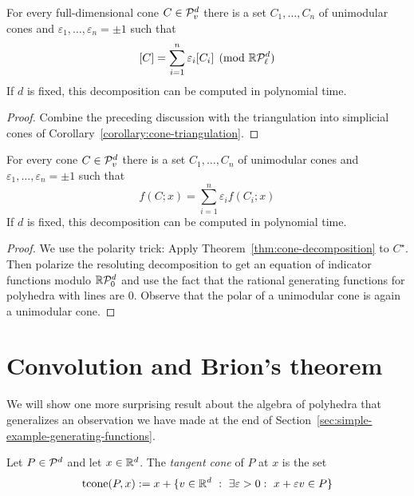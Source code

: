 \begin{theorem}
  \label{thm:cone-decomposition}
  For every full-dimensional cone $C \in \mathcal{P}_v^d$
  there is a set $C_1, \ldots, C_n$ of unimodular cones
  and $\varepsilon_1, \ldots, \varepsilon_n = \pm 1$ such that
  \[
    [C] = \sum_{i=1}^n \varepsilon_i [C_i] \pmod{\mathbb{R}\mathcal{P}_\ell^d}
  \]
  If $d$ is fixed, this decomposition can be computed in polynomial time.
\end{theorem}
\begin{proof}
  Combine the preceding discussion with the triangulation into simplicial cones of Corollary~\ref{corollary:cone-triangulation}.
\end{proof}

\begin{corollary}
  \label{corollary:cone-decomposition}
  For every cone $C \in \mathcal{P}_v^d$
  there is a set $C_1, \ldots, C_n$ of unimodular cones
  and $\varepsilon_1, \ldots, \varepsilon_n = \pm1$ such that
  \[
    f(C;x) = \sum_{i=1}^n \varepsilon_i f(C_i;x)
  \]
  If $d$ is fixed, this decomposition can be computed in polynomial time.
\end{corollary}
\begin{proof}
  We use the polarity trick:
  Apply Theorem~\ref{thm:cone-decomposition} to $C^\star$.
  Then polarize the resoluting decomposition to get an equation of indicator functions modulo $\mathbb{R}\mathcal{P}_0^d$
  and use the fact that the rational generating functions for polyhedra with lines are $0$.
  Observe that the polar of a unimodular cone is again a unimodular cone.
\end{proof}






\section{Convolution and Brion's theorem}

We will show one more surprising result about the algebra of polyhedra
that generalizes an observation we have made at the end of Section~\ref{sec:simple-example-generating-functions}.

\begin{definition}
  Let $P \in \mathcal{P}^d$ and let $x \in \mathbb{R}^d$.
  The \emph{tangent cone} of $P$ at $x$ is the set
  \[
    \operatorname{tcone}(P,x) := x + \{ v \in \mathbb{R}^d ~:~ \exists \varepsilon > 0:~ x + \varepsilon v \in P \}
  \]
\end{definition}

